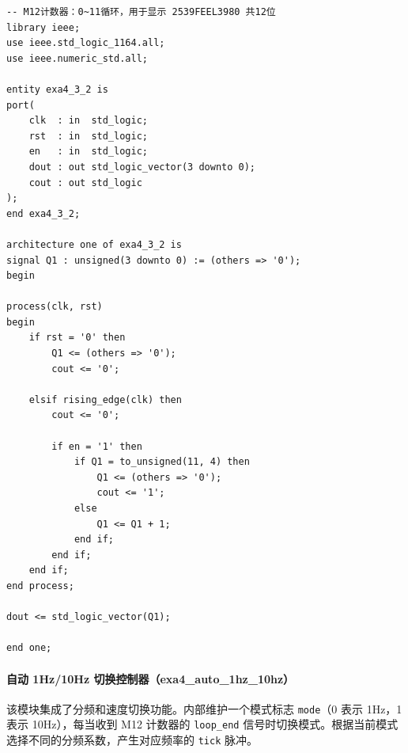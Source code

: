 \documentclass{ctexrep}
\begin{document}
\begin{verbatim}
-- M12计数器：0~11循环，用于显示 2539FEEL3980 共12位
library ieee;
use ieee.std_logic_1164.all;
use ieee.numeric_std.all;

entity exa4_3_2 is
port(
    clk  : in  std_logic;
    rst  : in  std_logic;
    en   : in  std_logic;
    dout : out std_logic_vector(3 downto 0);
    cout : out std_logic
);
end exa4_3_2;

architecture one of exa4_3_2 is
signal Q1 : unsigned(3 downto 0) := (others => '0');
begin

process(clk, rst)
begin
    if rst = '0' then
        Q1 <= (others => '0');
        cout <= '0';

    elsif rising_edge(clk) then
        cout <= '0';

        if en = '1' then
            if Q1 = to_unsigned(11, 4) then
                Q1 <= (others => '0');
                cout <= '1';
            else
                Q1 <= Q1 + 1;
            end if;
        end if;
    end if;
end process;

dout <= std_logic_vector(Q1);

end one;
\end{verbatim}
\label{e4:lst:counter2}

\paragraph{自动 1Hz/10Hz 切换控制器（exa4\_auto\_1hz\_10hz）}

该模块集成了分频和速度切换功能。内部维护一个模式标志 \texttt{mode}（0 表示 1Hz，1 表示 10Hz），每当收到 M12 计数器的 \texttt{loop\_end} 信号时切换模式。根据当前模式选择不同的分频系数，产生对应频率的 \texttt{tick} 脉冲。
\end{document}
